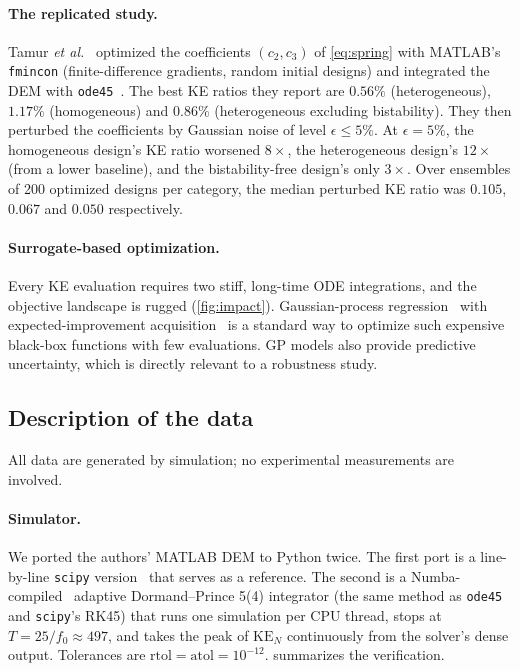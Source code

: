 \documentclass[12pt,letterpaper]{article}
\newcommand{\KE}{\mathrm{KE}}
\begin{document}
\paragraph{The replicated study.}
Tamur \emph{et al.}~\cite{tamur} optimized the coefficients $(c_2,c_3)$ of
\cref{eq:spring} with MATLAB's \texttt{fmincon} (finite-difference gradients, random
initial designs) and integrated the DEM with \texttt{ode45}~\cite{dormand,shampine}.
The best KE ratios they report are $0.56\%$ (heterogeneous), $1.17\%$ (homogeneous) and
$0.86\%$ (heterogeneous excluding bistability). They then perturbed the coefficients by
Gaussian noise of level $\epsilon\le5\%$. At $\epsilon=5\%$, the homogeneous design's
KE ratio worsened $8\times$, the heterogeneous design's $12\times$ (from a lower
baseline), and the bistability-free design's only $3\times$. Over ensembles of 200
optimized designs per category, the median perturbed KE ratio was $0.105$, $0.067$ and
$0.050$ respectively.

\paragraph{Surrogate-based optimization.}
Every KE evaluation requires two stiff, long-time ODE integrations, and the objective
landscape is rugged (\cref{fig:impact}). Gaussian-process regression~\cite{rasmussen}
with expected-improvement acquisition~\cite{jones} is a standard way to optimize such
expensive black-box functions with few evaluations. GP models also provide predictive
uncertainty, which is directly relevant to a robustness study.

\subsection{Description of the data}

All data are generated by simulation; no experimental measurements are involved.

\paragraph{Simulator.}
We ported the authors' MATLAB DEM to Python twice. The first port is a line-by-line
\texttt{scipy} version~\cite{scipy} that serves as a reference. The second is a
Numba-compiled~\cite{numba} adaptive Dormand--Prince 5(4) integrator (the same method
as \texttt{ode45} and \texttt{scipy}'s RK45) that runs one simulation per CPU thread,
stops at $T=25/f_0\approx497$, and takes the peak of $\KE_N$ continuously from the
solver's dense output. Tolerances are $\text{rtol}=\text{atol}=10^{-12}$.
 summarizes the verification.
\end{document}
